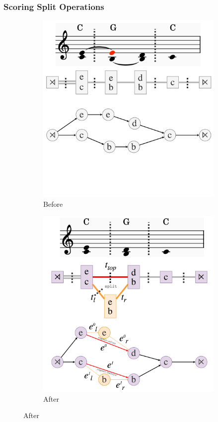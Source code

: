\documentclass[12pt,a4paper,twoside,openany]{report} \usepackage[pdfborder={0 0 0}]{hyperref}    %
\theoremstyle{definition} \newtheorem{definition}{Definition}[section]
\begin{document}
    \subsubsection{Scoring Split Operations}


  \begin{figure}[ht] \centering \begin{subfigure}[t]{.49\textwidth}
    \centering\includegraphics[keepaspectratio,width=\textwidth]{impl/reduction/before.png} \caption{Before}
    \label{fig:reductionBefore} \end{subfigure} \begin{subfigure}[t]{.49\textwidth}
    \centering\includegraphics[keepaspectratio,width=\textwidth]{impl/reduction/after.png} \caption{After}

\end{subfigure}
\end{figure}
\end{document}

